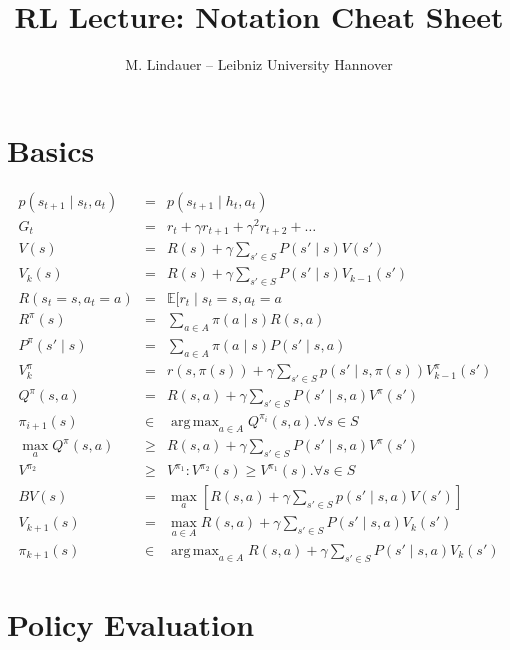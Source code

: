 \documentclass[]{article}
\title{RL Lecture: Notation Cheat Sheet}
\author{M. Lindauer -- Leibniz University Hannover}
\date{}
\DeclareMathOperator*{\argmax}{arg\,max}
\begin{document}
\maketitle

\section{Basics}

\begin{eqnarray}
	 p(s_{t+1} \mid s_t, a_t) &=& p(s_{t+1} \mid h_t, a_t) \\
	 G_t &=& r_t + \gamma r_{t+1} + \gamma^2 r_{t+2} + \ldots\\
	 V(s) &=& R(s) + \gamma \sum_{s' \in S} P(s'\mid s) V(s')\\
	 V_k(s) &=& R(s) + \gamma \sum_{s' \in S} P(s' \mid s) V_{k-1}(s')\\
	 R(s_t=s, a_t=a) &=& \mathbb{E}[r_t \mid s_t=s, a_t=a\\
	 R^\pi (s) &=& \sum_{a\in A} \pi(a\mid s ) R(s,a) \\
	 P^\pi (s'\mid s) &=& \sum_{a\in A} \pi(a \mid s) P(s' \mid s,a)\\
	 V^\pi_k  &=& r(s, \pi(s)) + \gamma \sum_{s'\in S} p(s'\mid s, \pi(s)) V_{k-1}^\pi (s')\\
	 Q^\pi(s,a) &=& R(s,a) + \gamma \sum_{s' \in S} P(s' \mid s,a) V^\pi(s')\\
	 \pi_{i+1}(s) &\in& \argmax_{a\in A} Q^{\pi_i} (s,a). \forall s \in S \\
    \max_a Q^\pi(s,a) &\geq& R(s,a) + \gamma \sum_{s' \in S} P(s' \mid s,a) V^\pi(s')\\
    V^{\pi_2} &\geq& V^{\pi_1}: V^{\pi_2}(s) \geq V^{\pi_1}(s). \forall s \in S\\
    BV(s) &=& \max_{a} [ R(s,a) + \gamma \sum_{s' \in S} p(s' \mid s,a)  V(s')  ]\\
    V_{k+1}(s) &=& \max_{a\in A } R(s,a) + \gamma \sum_{s' \in S } P(s' \mid s,a) V_k(s') \\
    \pi_{k+1}(s) &\in& \argmax_{a \in A} R(s,a) + \gamma \sum_{s' \in S} P(s' \mid s,a) V_k(s')
\end{eqnarray}

\newpage
\section{Policy Evaluation}
\end{document}
